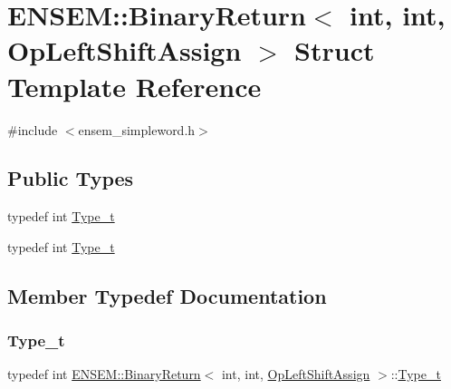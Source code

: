 \hypertarget{structENSEM_1_1BinaryReturn_3_01int_00_01int_00_01OpLeftShiftAssign_01_4}{}\section{E\+N\+S\+EM\+:\+:Binary\+Return$<$ int, int, Op\+Left\+Shift\+Assign $>$ Struct Template Reference}
\label{structENSEM_1_1BinaryReturn_3_01int_00_01int_00_01OpLeftShiftAssign_01_4}


{\ttfamily \#include $<$ensem\+\_\+simpleword.\+h$>$}

\subsection*{Public Types}
\begin{DoxyCompactItemize}
\item 
typedef int \mbox{\hyperlink{structENSEM_1_1BinaryReturn_3_01int_00_01int_00_01OpLeftShiftAssign_01_4_abe15562b5780c9ed9e3357639d2843ba}{Type\+\_\+t}}
\item 
typedef int \mbox{\hyperlink{structENSEM_1_1BinaryReturn_3_01int_00_01int_00_01OpLeftShiftAssign_01_4_abe15562b5780c9ed9e3357639d2843ba}{Type\+\_\+t}}
\end{DoxyCompactItemize}


\subsection{Member Typedef Documentation}
\mbox{\label{structENSEM_1_1BinaryReturn_3_01int_00_01int_00_01OpLeftShiftAssign_01_4_abe15562b5780c9ed9e3357639d2843ba}} 
\subsubsection{\texorpdfstring{Type\_t}{Type\_t}\hspace{0.1cm}{\footnotesize\ttfamily [1/2]}}
{\footnotesize\ttfamily typedef int \mbox{\hyperlink{structENSEM_1_1BinaryReturn}{E\+N\+S\+E\+M\+::\+Binary\+Return}}$<$ int, int, \mbox{\hyperlink{structENSEM_1_1OpLeftShiftAssign}{Op\+Left\+Shift\+Assign}} $>$\+::\mbox{\hyperlink{structENSEM_1_1BinaryReturn_3_01int_00_01int_00_01OpLeftShiftAssign_01_4_abe15562b5780c9ed9e3357639d2843ba}{Type\+\_\+t}}}

